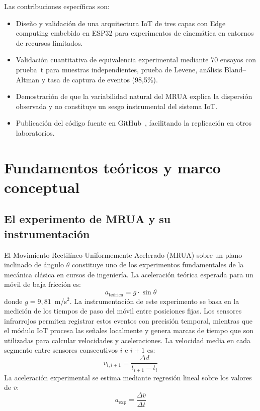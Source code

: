 \documentclass{espol-rte}
\begin{document}
Las contribuciones espec\'ificas son:
\begin{itemize}
  \item Dise\~no y validaci\'on de una arquitectura IoT de tres capas con Edge computing embebido en ESP32 para experimentos de cinem\'atica en entornos de recursos limitados.
  \item Validaci\'on cuantitativa de equivalencia experimental mediante 70 ensayos con prueba~t para muestras independientes, prueba de Levene, an\'alisis Bland--Altman y tasa de captura de eventos (98{,}5\%).
  \item Demostraci\'on de que la variabilidad natural del MRUA explica la dispersi\'on observada y no constituye un sesgo instrumental del sistema IoT.
  \item Publicaci\'on del c\'odigo fuente en GitHub~\parencite{r15}, facilitando la replicaci\'on en otros laboratorios.
\end{itemize}

\section{Fundamentos te\'oricos y marco conceptual}

\subsection{El experimento de MRUA y su instrumentaci\'on}

El Movimiento Rectil\'ineo Uniformemente Acelerado (MRUA) sobre un plano inclinado de \'angulo $\theta$ constituye uno de los experimentos fundamentales de la mec\'anica cl\'asica en cursos de ingenier\'ia. La aceleraci\'on te\'orica esperada para un m\'ovil de baja fricci\'on es:
\begin{equation}
  a_{\text{te\'orica}} = g \cdot \sin\theta
  \label{eq:mruateorico}
\end{equation}
donde $g = 9{,}81$~m/s$^2$. La instrumentaci\'on de este experimento se basa en la medici\'on de los tiempos de paso del m\'ovil entre posiciones fijas. Los sensores infrarrojos permiten registrar estos eventos con precisi\'on temporal, mientras que el m\'odulo IoT procesa las se\~nales localmente y genera marcas de tiempo que son utilizadas para calcular velocidades y aceleraciones. La velocidad media en cada segmento entre sensores consecutivos $i$ e $i+1$ es:
\begin{equation}
  \bar{v}_{i,i+1} = \frac{\Delta d}{t_{i+1} - t_i}
  \label{eq:velocidad}
\end{equation}
La aceleraci\'on experimental se estima mediante regresi\'on lineal sobre los valores de $\bar{v}$:
\begin{equation}
  a_{\text{exp}} = \frac{\Delta \bar{v}}{\Delta t}
  \label{eq:aceleracion}
\end{equation}
\end{document}
